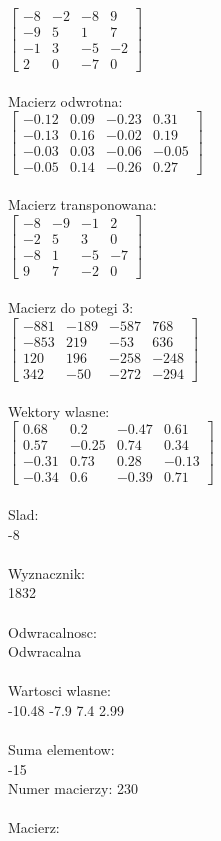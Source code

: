 \documentclass[a4paper,12pt]{article}
\begin{document}
$\begin{bmatrix} -8&-2&-8&9\\-9&5&1&7\\-1&3&-5&-2\\2&0&-7&0 \end{bmatrix}$
\\
\\
Macierz odwrotna:\\

$\begin{bmatrix} -0.12&0.09&-0.23&0.31\\-0.13&0.16&-0.02&0.19\\-0.03&0.03&-0.06&-0.05\\-0.05&0.14&-0.26&0.27 \end{bmatrix}$
\\
\\
Macierz transponowana:\\

$\begin{bmatrix} -8&-9&-1&2\\-2&5&3&0\\-8&1&-5&-7\\9&7&-2&0 \end{bmatrix}$
\\
\\
Macierz do potegi 3:\\

$\begin{bmatrix} -881&-189&-587&768\\-853&219&-53&636\\120&196&-258&-248\\342&-50&-272&-294 \end{bmatrix}$
\\
\\
Wektory wlasne:\\

$\begin{bmatrix} 0.68&0.2&-0.47&0.61\\0.57&-0.25&0.74&0.34\\-0.31&0.73&0.28&-0.13\\-0.34&0.6&-0.39&0.71 \end{bmatrix}$
\\
\\
Slad:\\
-8
\\
\\
Wyznacznik:\\
1832
\\
\\
Odwracalnosc:\\
Odwracalna
\\
\\
Wartosci wlasne:\\
-10.48 -7.9 7.4 2.99
\\
\\
Suma elementow:\\
-15
\\
\newpage
Numer macierzy:
230
\\
\\
Macierz:\\
\end{document}
